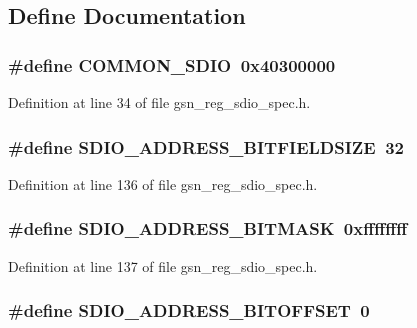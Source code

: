 \subsection{Define Documentation}
\hypertarget{a00571_a3248e44c75c99fdc1a2b553226866c1b}{
\subsubsection[{COMMON\_\-SDIO}]{\setlength{\rightskip}{0pt plus 5cm}\#define COMMON\_\-SDIO~0x40300000}}
\label{a00571_a3248e44c75c99fdc1a2b553226866c1b}


Definition at line 34 of file gsn\_\-reg\_\-sdio\_\-spec.h.

\hypertarget{a00571_ae9ff569ad7a9fb3caf54c873654921a2}{
\subsubsection[{SDIO\_\-ADDRESS\_\-BITFIELDSIZE}]{\setlength{\rightskip}{0pt plus 5cm}\#define SDIO\_\-ADDRESS\_\-BITFIELDSIZE~32}}
\label{a00571_ae9ff569ad7a9fb3caf54c873654921a2}


Definition at line 136 of file gsn\_\-reg\_\-sdio\_\-spec.h.

\hypertarget{a00571_aaf686ec76989282e9179ea0627c443cc}{
\subsubsection[{SDIO\_\-ADDRESS\_\-BITMASK}]{\setlength{\rightskip}{0pt plus 5cm}\#define SDIO\_\-ADDRESS\_\-BITMASK~0xffffffff}}
\label{a00571_aaf686ec76989282e9179ea0627c443cc}


Definition at line 137 of file gsn\_\-reg\_\-sdio\_\-spec.h.

\hypertarget{a00571_af86e27a2ce6863bb7754cbe254e4f475}{
\subsubsection[{SDIO\_\-ADDRESS\_\-BITOFFSET}]{\setlength{\rightskip}{0pt plus 5cm}\#define SDIO\_\-ADDRESS\_\-BITOFFSET~0}}
\label{a00571_af86e27a2ce6863bb7754cbe254e4f475}


